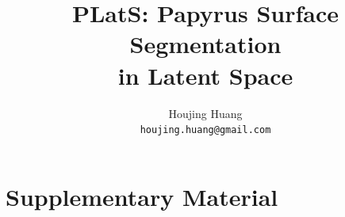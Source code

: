 \documentclass[10pt,twocolumn,letterpaper]{article}
\title{PLatS: Papyrus Surface Segmentation\protect\\in Latent Space}
\author{Houjing Huang\\\texttt{houjing.huang@gmail.com}}
\begin{document}
\raggedbottom
\maketitle
\begin{abstract}

\end{abstract}




\clearpage
{\small


}
\clearpage
\appendix
\renewcommand{\dbltopfraction}{0.95}
\renewcommand{\textfraction}{0.05}
\setcounter{dbltopnumber}{4}
\setcounter{topnumber}{4}
\setcounter{totalnumber}{6}
\section*{Supplementary Material}

\end{document}
